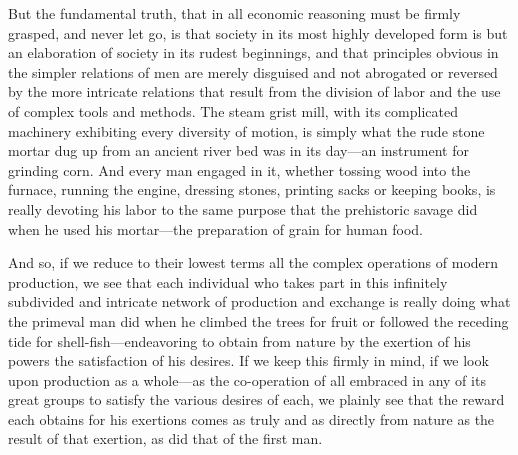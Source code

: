 But the fundamental truth, that in all economic reasoning must be firmly
grasped, and never let go, is that society in its most highly developed
form is but an elaboration of society in its rudest beginnings, and that
principles obvious in the simpler relations of men are merely disguised
and not abrogated or reversed by the more intricate relations that
result from the division of labor and the use of complex tools and
methods. The steam grist mill, with its complicated machinery exhibiting
every diversity of motion, is simply what the rude stone mortar dug up
from an ancient river bed was in its day---an instrument for grinding
corn. And every man engaged in it, whether tossing wood into the
furnace, running the engine, dressing stones, printing sacks or keeping
books, is really devoting his labor to the same purpose that the
prehistoric savage did when he used his mortar---the preparation of
grain for human food.

And so, if we reduce to their lowest terms all the complex operations of
modern production, we see that each individual who takes part in this
infinitely subdivided and intricate network of production and exchange
is really doing what the primeval man did when he climbed the trees for
fruit or followed the receding tide for shell-fish---endeavoring to
obtain from nature by the exertion of his powers the satisfaction of his
desires. If we keep this firmly in mind, if we look upon production as a
whole---as the co-operation of all embraced in any of its great groups
to satisfy the various desires of each, we plainly see that the reward
each obtains for his exertions comes as truly and as directly from
nature as the result of that exertion, as did that of the first man.

